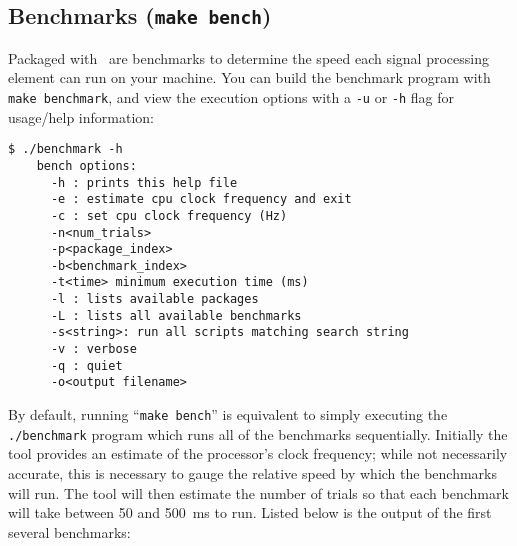 \subsection{Benchmarks ({\tt make bench})}
\label{section:installation:targets:benchmarks}
Packaged with \liquid\ are benchmarks to determine the speed each signal
processing element can run on your machine.
You can build the benchmark program with {\tt make benchmark}, and view
the execution options with a {\tt -u} or {\tt -h} flag for usage/help
information:
%
\begin{Verbatim}[fontsize=\small]
    $ ./benchmark -h
    bench options:
      -h : prints this help file
      -e : estimate cpu clock frequency and exit
      -c : set cpu clock frequency (Hz)
      -n<num_trials>
      -p<package_index>
      -b<benchmark_index>
      -t<time> minimum execution time (ms)
      -l : lists available packages
      -L : lists all available benchmarks
      -s<string>: run all scripts matching search string
      -v : verbose
      -q : quiet
      -o<output filename>
\end{Verbatim}
%
By default, running ``{\tt make bench}'' is equivalent to simply
executing the {\tt ./benchmark} program which runs all of the benchmarks
sequentially.
Initially the tool provides an estimate of the processor's clock
frequency;
while not necessarily accurate, this is necessary to gauge the relative
speed by which the benchmarks will run.
The tool will then estimate the number of trials so that each benchmark
will take between 50 and 500~ms to run.
Listed below is the output of the first several benchmarks:
%

